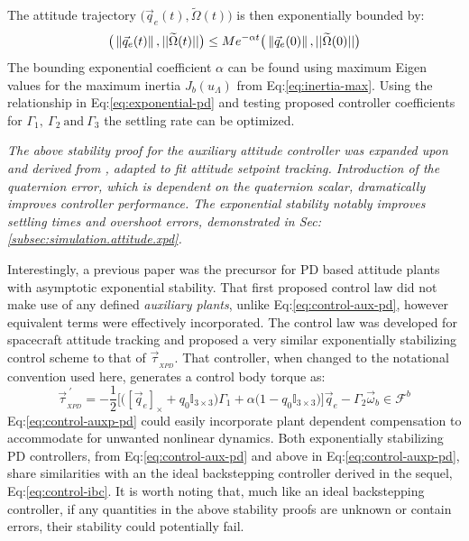 The attitude trajectory $\big(\vec{q}_e(t),\widetilde{\Omega}(t)\big)$ is then exponentially bounded by:
\begin{equation}\label{eq:exponential-pd}
\big(\left\lVert\vec{q}_e(t)\right\rVert,||\widetilde{\Omega}(t)||\big)\leq Me^{-\alpha t}\big(\left\lVert\vec{q}_e(0)\right\rVert,||\widetilde{\Omega}(0)||\big)
\end{equation}
The bounding exponential coefficient $\alpha$ can be found using maximum Eigen values for the maximum inertia $J_b(u_{\Lambda})$ from Eq:\ref{eq:inertia-max}. Using the relationship in Eq:\ref{eq:exponential-pd} and testing proposed controller coefficients for $\Gamma_1,~\Gamma_2~\text{and}~\Gamma_3$ the settling rate can be optimized.
\par
\emph{\color{Gray}The above stability proof for the auxiliary attitude controller was expanded upon and derived from \cite{attitudestabilization}, adapted to fit attitude setpoint tracking. Introduction of the quaternion error, which is dependent on the quaternion scalar, dramatically improves controller performance. The exponential stability notably improves settling times and overshoot errors, demonstrated in Sec:\ref{subsec:simulation.attitude.xpd}.}
\par
Interestingly, a previous paper \cite{robustattitude} was the precursor for PD based attitude plants with asymptotic exponential stability. That first proposed control law did not make use of any defined \emph{auxiliary plants}, unlike Eq:\ref{eq:control-aux-pd}, however equivalent terms were effectively incorporated. The control law was developed for spacecraft attitude tracking and proposed a very similar exponentially stabilizing control scheme to that of $\vec{\tau}_{_{XPD}}$. That controller, when changed to the notational convention used here, generates a control body torque as:
\begin{equation}\label{eq:control-auxp-pd}
\vec{\tau}^{\hspace{3pt}'}_{_{XPD}}=-\frac{1}{2}\Big[\big([\vec{q}_e]_\times+q_0\mathbb{I}_{3\times 3}\big)\Gamma_1+\alpha\big(1-q_0\mathbb{I}_{3\times 3}\big)\Big]\vec{q}_e-\Gamma_2\vec{\omega}_b\in\mathcal{F}^b
\end{equation} 
Eq:\ref{eq:control-auxp-pd} could easily incorporate plant dependent compensation to accommodate for unwanted nonlinear dynamics. Both exponentially stabilizing PD controllers, from Eq:\ref{eq:control-aux-pd} and above in Eq:\ref{eq:control-auxp-pd}, share similarities with an the ideal backstepping controller derived in the sequel, Eq:\ref{eq:control-ibc}. It is worth noting that, much like an ideal backstepping controller, if any quantities in the above stability proofs are unknown or contain errors, their stability could potentially fail.
